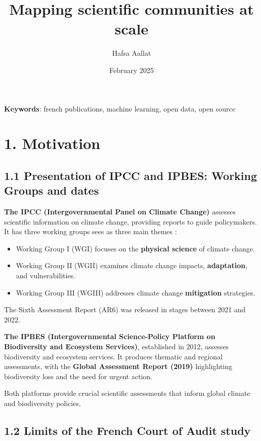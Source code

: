 \documentclass[
]{article}
\title{Mapping scientific communities at scale}
\author[%
  1%
  ]{%
  Hafsa Aallat%
}
\affil[1]{French Ministry of Higher Education and Research, Paris,
France}
\date{February 2025}
\providecommand{\tightlist}{%
  \setlength{\itemsep}{0pt}\setlength{\parskip}{0pt}}
\begin{document}
\maketitle

\textbf{Keywords}: french publications, machine learning, open data,
open source

\hypertarget{motivation}{%
\section{1. Motivation}\label{motivation}}

\hypertarget{presentation-of-ipcc-and-ipbes-working-groups-and-dates}{%
\subsection{1.1 Presentation of IPCC and IPBES: Working Groups and
dates}\label{presentation-of-ipcc-and-ipbes-working-groups-and-dates}}

\textbf{The IPCC (Intergovernmental Panel on Climate Change)} assesses
scientific information on climate change, providing reports to guide
policymakers. It has three working groups sees as three main themes :

\begin{itemize}
\tightlist
\item
  Working Group I (WGI) focuses on the \textbf{physical science} of
  climate change.
\item
  Working Group II (WGII) examines climate change impacts,
  \textbf{adaptation}, and vulnerabilities.
\item
  Working Group III (WGIII) addresses climate change \textbf{mitigation}
  strategies.
\end{itemize}

The Sixth Assessment Report (AR6) was released in stages between 2021
and 2022.

\textbf{The IPBES (Intergovernmental Science-Policy Platform on
Biodiversity and Ecosystem Services)}, established in 2012, assesses
biodiversity and ecosystem services. It produces thematic and regional
assessments, with the \textbf{Global Assessment Report (2019)}
highlighting biodiversity loss and the need for urgent action.

Both platforms provide crucial scientific assessments that inform global
climate and biodiversity policies.

\hypertarget{limits-of-the-french-court-of-audit-study}{%
\subsection{1.2 Limits of the French Court of Audit
study}\label{limits-of-the-french-court-of-audit-study}}
\end{document}
